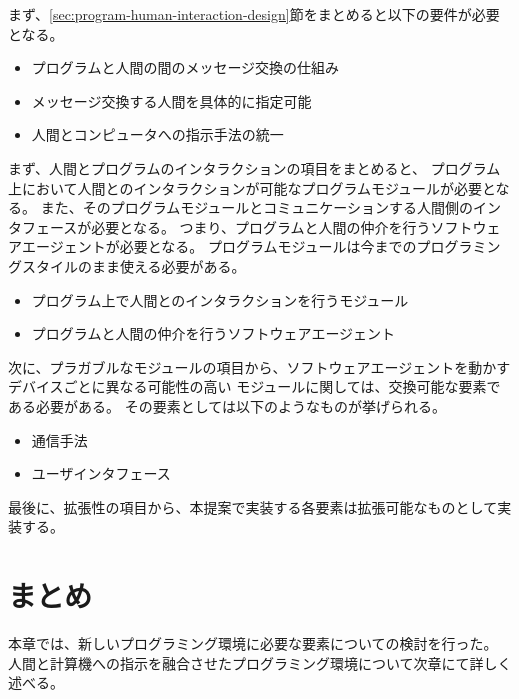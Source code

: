 まず、\ref{sec:program-human-interaction-design}節をまとめると以下の要件が必要となる。

\begin{itemize}
\itemsep1pt\parskip0pt
\item
  プログラムと人間の間のメッセージ交換の仕組み
\item
  メッセージ交換する人間を具体的に指定可能
\item
  人間とコンピュータへの指示手法の統一
\end{itemize}

まず、人間とプログラムのインタラクションの項目をまとめると、
プログラム上において人間とのインタラクションが可能なプログラムモジュールが必要となる。
また、そのプログラムモジュールとコミュニケーションする人間側のインタフェースが必要となる。
つまり、プログラムと人間の仲介を行うソフトウェアエージェントが必要となる。
プログラムモジュールは今までのプログラミングスタイルのまま使える必要がある。

\begin{itemize}
\itemsep1pt\parskip0pt
\item
  プログラム上で人間とのインタラクションを行うモジュール
\item
  プログラムと人間の仲介を行うソフトウェアエージェント
\end{itemize}

次に、プラガブルなモジュールの項目から、ソフトウェアエージェントを動かすデバイスごとに異なる可能性の高い
モジュールに関しては、交換可能な要素である必要がある。
その要素としては以下のようなものが挙げられる。

\begin{itemize}
\itemsep1pt\parskip0pt
\item
  通信手法
\item
  ユーザインタフェース
\end{itemize}

最後に、拡張性の項目から、本提案で実装する各要素は拡張可能なものとして実装する。

\section{まとめ}\label{ux307eux3068ux3081}

本章では、新しいプログラミング環境に必要な要素についての検討を行った。
人間と計算機への指示を融合させたプログラミング環境について次章にて詳しく述べる。
